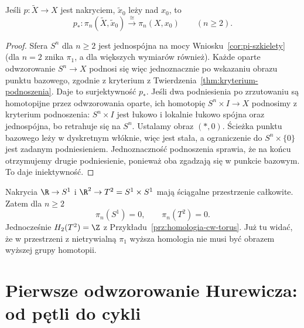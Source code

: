 \begin{stwierdzenie}
\label{prop:pi-n-nakrycie}
Jeśli $p:\widetilde X\to X$
jest nakryciem, $\widetilde x_0$
leży nad $x_0$, to
\[
 p_*:\pi_n(\widetilde X,\widetilde x_0)
 \xrightarrow{\ \cong\ }
 \pi_n(X,x_0)\qquad(n\geq2).
\]
\end{stwierdzenie}
\begin{proof}
Sfera $S^n$ dla $n\geq2$
jest jednospójna na mocy
Wniosku~\ref{cor:pi-szkielety}
(dla $n=2$ znika $\pi_1$,
a dla większych wymiarów
również). Każde oparte
odwzorowanie $S^n\to X$ podnosi
się więc jednoznacznie
po wskazaniu obrazu
punktu bazowego,
zgodnie z kryterium
z Twierdzenia~\ref{thm:kryterium-podnoszenia}.
Daje to surjektywność $p_*$.
Jeśli dwa podniesienia
po zrzutowaniu są
homotopijne przez odwzorowania oparte,
ich homotopię
$S^n\times I\to X$ podnosimy z kryterium podnoszenia:
$S^n\times I$ jest łukowo i lokalnie łukowo spójna oraz jednospójna,
bo retrahuje się na $S^n$. Ustalamy obraz $(\ast,0)$.
Ścieżka punktu bazowego leży w dyskretnym włóknie, więc jest stała,
a ograniczenie do $S^n\times\{0\}$ jest zadanym podniesieniem.
Jednoznaczność podnoszenia
sprawia, że na końcu
otrzymujemy drugie
podniesienie, ponieważ
oba zgadzają się w
punkcie bazowym.
To daje iniektywność.
\end{proof}

\begin{przyklad}
\label{prz:pi-torus}
Nakrycia $\R\to S^1$ i
$\R^2\to T^2=S^1\times S^1$
mają ściągalne przestrzenie
całkowite. Zatem dla $n\geq2$
\[
 \pi_n(S^1)=0,\qquad
 \pi_n(T^2)=0.
\]
Jednocześnie
$H_2(T^2)=\Z$ z
Przykładu~\ref{prz:homologia-cw-torus}.
Już tu widać, że w
przestrzeni z nietrywialną
$\pi_1$ wyższa homologia
nie musi być obrazem
wyższej grupy homotopii.
\end{przyklad}

\section{Pierwsze odwzorowanie Hurewicza: od pętli do cykli}
\label{sec:hurewicz-jeden}

